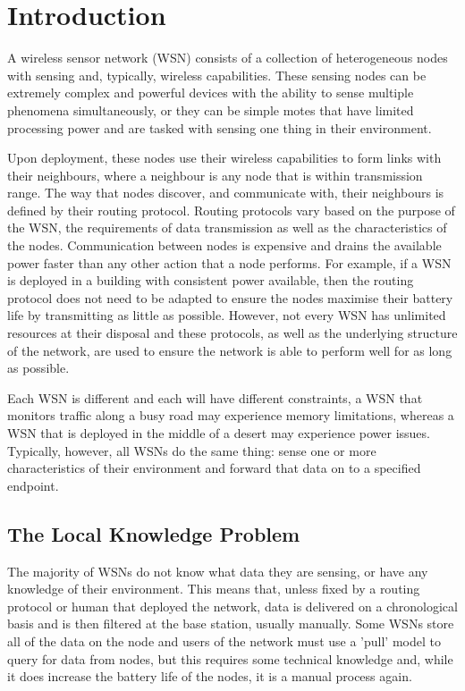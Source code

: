 \chapter{Introduction}
A wireless sensor network (WSN) consists of a collection of heterogeneous nodes with sensing and, typically, wireless capabilities. These sensing nodes can be extremely complex and powerful devices with the ability to sense multiple phenomena simultaneously, or they can be simple motes that have limited processing power and are tasked with sensing one thing in their environment.

Upon deployment, these nodes use their wireless capabilities to form links with their neighbours, where a neighbour is any node that is within transmission range. The way that nodes discover, and communicate with, their neighbours is defined by their routing protocol. Routing protocols vary based on the purpose of the WSN, the requirements of data transmission as well as the characteristics of the nodes. Communication between nodes is expensive and drains the available power faster than any other action that a node performs. For example, if a WSN is deployed in a building with consistent power available, then the routing protocol does not need to be adapted to ensure the nodes maximise their battery life by transmitting as little as possible. However, not every WSN has unlimited resources at their disposal and these protocols, as well as the underlying structure of the network, are used to ensure the network is able to perform well for as long as possible.

Each WSN is different and each will have different constraints, a WSN that monitors traffic along a busy road may experience memory limitations, whereas a  WSN that is deployed in the middle of a desert may experience power issues. Typically, however, all WSNs do the same thing: sense one or more characteristics of their environment and forward that data on to a specified endpoint.

\section{The Local Knowledge Problem}
The majority of WSNs do not know what data they are sensing, or have any knowledge of their environment. This means that, unless fixed by a routing protocol or human that deployed the network, data is delivered on a chronological basis and is then filtered at the base station, usually manually. Some WSNs store all of the data on the node and users of the network must use a 'pull' model to query for data from nodes, but this requires some technical knowledge and, while it does increase the battery life of the nodes, it is a manual process again.

